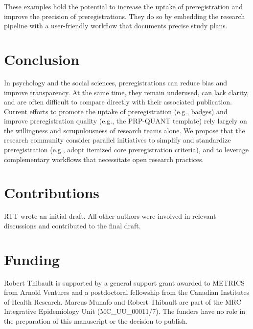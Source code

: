 \documentclass[authordate, meta, issue]{jote-new-article}
\begin{document}
These examples hold the potential to increase the uptake of preregistration and improve the precision of preregistrations. They do so by embedding the research pipeline with a user-friendly workflow that documents precise study plans.








\section{Conclusion}



In psychology and the social sciences, preregistrations can reduce bias and improve transparency. At the same time, they remain underused, can lack clarity, and are often difficult to compare directly with their associated publication. Current efforts to promote the uptake of preregistration (e.g., badges) and improve preregistration quality (e.g., the PRP-QUANT template) rely largely on the willingness and scrupulousness of research teams alone. We propose that the research community consider parallel initiatives to simplify and standardize preregistration (e.g., adopt itemized core preregistration criteria), and to leverage complementary workflows that necessitate open research practices.







\section{Contributions}



RTT wrote an initial draft. All other authors were involved in relevant discussions and contributed to the final draft.







\section{Funding}



Robert Thibault is supported by a general support grant awarded to METRICS from Arnold Ventures and a postdoctoral fellowship from the Canadian Institutes of Health Research. Marcus Munafo and Robert Thibault are part of the MRC Integrative Epidemiology Unit (MC\_UU\_00011/7). The funders have no role in the preparation of this manuscript or the decision to publish.
\end{document}
